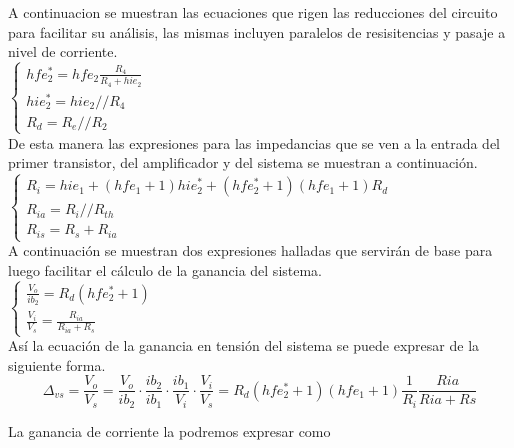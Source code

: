 A continuacion se muestran las ecuaciones que rigen las reducciones del circuito para facilitar su análisis, las mismas incluyen paralelos de resisitencias y pasaje a nivel de corriente. \\

		$
		\begin{cases}
		hfe_{2}^{*}=hfe_{2}\frac{R_{4}}{R_{4}+hie_{2}} \\
		hie_{2}^{*}=hie_{2}//R_{4} \\
		R_{d}=R_{e}//R_{2}
		\end{cases}
		\label{mod_inc_ecs}
		$ \\

De esta manera las expresiones para las impedancias que se ven a la entrada del primer transistor, del amplificador y del sistema se muestran a continuación. \\

		$
		\begin{cases}	
		R_{i}=hie_{1}+(hfe_{1}+1)hie_{2}^{*}+(hfe_{2}^{*}+1)(hfe_{1}+1)R_{d} \\
		R_{ia}=R_{i} // R_{th} \\
		R_{is}=R_{s}+R_{ia}
		\end{cases}
		\label{mod_inc_ecs}
		$\\

A continuación se muestran dos expresiones halladas que servirán de base para luego facilitar el cálculo de la ganancia del sistema.\\

		$
		\begin{cases}	
		\frac{V_{o}}{ib_{2}}=R_{d}(hfe_{2}^{*}+1) \\
		\frac{V_{i}}{V_{s}}=\frac{R_{ia}}{R_{ia}+R_{s}}
		\end{cases}
		\label{mod_inc_ecs}
		$\\

Así la ecuación de la ganancia en tensión del sistema se puede expresar de la siguiente forma. \\

	\begin{equation}	
		\Delta _{vs}=\frac{V_{o}}{V_{s}}=\frac{V_{o}}{ib_{2}}\cdot\frac{ib_{2}}{ib_{1}}\cdot\frac{ib_{1}}{V_{i}}\cdot\frac{V_{i}}{V_{s}}=R_{d}(hfe_{2}^{*}+1)(hfe_{1}+1)\frac{1}{R_{i}}\frac{Ria}{Ria+Rs}
		\label{mod_inc_ecs}
	\end{equation}

La ganancia de corriente la podremos expresar como \\

